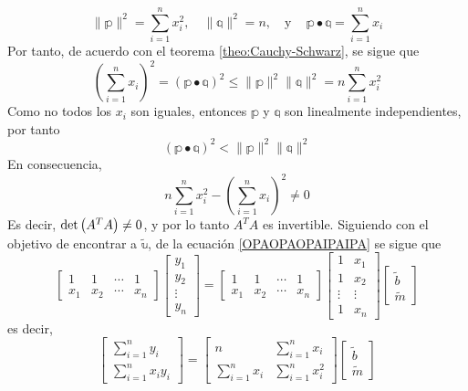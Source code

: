 $$\| \mathbb{p} \|^2 = \sum_{i=1}^{n} x_i^2, \!\quad \| \mathbb{q} \|^2 = n, \quad \text{y} \quad\, \mathbb{p} \bullet \mathbb{q} = \sum_{i=1}^{n} x_i$$
Por tanto, de acuerdo con el teorema \ref{theo:Cauchy-Schwarz}, se sigue que
$$\left( \sum_{i=1}^{n} x_i \right)^2 = (\mathbb{p} \bullet \mathbb{q})^2 \leq \| \mathbb{p} \|^2 \| \mathbb{q} \|^2 = n \sum_{i=1}^{n} x_i^2$$\newpage\noindent
Como no todos los $x_i$ son iguales, entonces $\mathbb{p}$ y $\mathbb{q}$ son linealmente independientes, por tanto
$$(\mathbb{p} \bullet \mathbb{q})^2 < \| \mathbb{p} \|^2 \| \mathbb{q} \|^2$$
En consecuencia,
$$n \sum_{i=1}^{n} x_i^2 - \left( \sum_{i=1}^{n} x_i \right)^2 \neq 0$$
Es decir, $\operatorname{det} \left(A^T A\right) \neq 0$, y por lo tanto $A^TA$ es invertible. Siguiendo con el objetivo de encontrar a $\tilde{\mathbb{u}}$, de la ecuación \eqref{OPAOPAOPAIPAIPA} se sigue que
$$\begin{bmatrix}
    1 & 1 & \cdots & 1 \\
    x_1 & x_2 & \cdots & x_n
\end{bmatrix} \begin{bmatrix}
    y_1 \\
    y_2 \\
    \vdots \\
    y_n
\end{bmatrix} = \begin{bmatrix}
    1 & 1 & \cdots & 1 \\
    x_1 & x_2 & \cdots & x_n
\end{bmatrix} \begin{bmatrix}
    1 & x_1 \\
    1 & x_2 \\
    \vdots & \vdots \\
    1 & x_n
\end{bmatrix} \begin{bmatrix}
    \tilde{b} \\
    \tilde{m}
\end{bmatrix}$$
es decir,
$$\begin{bmatrix}
    \displaystyle\sum_{i=1}^{n} y_i \\
    \displaystyle\sum_{i=1}^{n} x_iy_i
\end{bmatrix} = \begin{bmatrix}
    n & \displaystyle\sum_{i=1}^{n} x_i \\
    \displaystyle\sum_{i=1}^{n} x_i & \displaystyle\sum_{i=1}^{n}x_i^2
\end{bmatrix} \begin{bmatrix}
    \tilde{b} \\
    \tilde{m}
\end{bmatrix}$$
